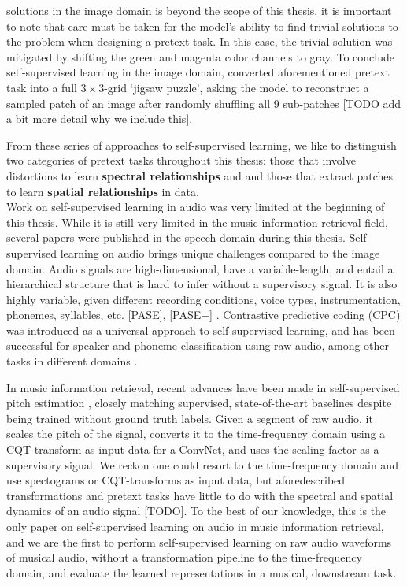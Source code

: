 solutions in the image domain is beyond the scope of this thesis, it is important to note that care must be taken for the model's ability to find trivial solutions to the problem when designing a pretext task. In this case, the trivial solution was mitigated by shifting the green and magenta color channels to gray. To conclude self-supervised learning in the image domain, \cite{noroozi_unsupervised_2016} converted aforementioned pretext task into a full $3\times 3$-grid `jigsaw puzzle', asking the model to reconstruct a sampled patch of an image after randomly shuffling all 9 sub-patches [TODO add a bit more detail why we include this].

From these series of approaches to self-supervised learning, we like to distinguish two categories of pretext tasks throughout this thesis: those that involve distortions to learn \textbf{spectral relationships} and and those that extract patches to learn \textbf{spatial relationships} in data. \\


Work on self-supervised learning in audio was very limited at the beginning of this thesis. While it is still very limited in the music information retrieval field, several papers were published in the speech domain during this thesis. Self-supervised learning on audio brings unique challenges compared to the image domain. Audio signals are high-dimensional, have a variable-length, and entail a hierarchical structure that is hard to infer without a supervisory signal. It is also highly variable, given different recording conditions, voice types, instrumentation, phonemes, syllables, etc. [PASE]\cite{Pascual2019}, [PASE+] \cite{Ravanelli2020}. Contrastive predictive coding (CPC) was introduced as a universal approach to self-supervised learning, and has been successful for speaker and phoneme classification using raw audio, among other tasks in different domains \cite{oord_representation_2019}.

In music information retrieval, recent advances have been made in self-supervised pitch estimation \cite{spice}, closely matching supervised, state-of-the-art baselines despite being trained without ground truth labels. Given a segment of raw audio, it scales the pitch of the signal, converts it to the time-frequency domain using a CQT transform as input data for a ConvNet, and uses the scaling factor as a supervisory signal. We reckon one could resort to the time-frequency domain and use spectograms or CQT-transforms as input data, but aforedescribed transformations and pretext tasks have little to do with the spectral and spatial dynamics of an audio signal [TODO]. To the best of our knowledge, this is the only paper on self-supervised learning on audio in music information retrieval, and we are the first to perform self-supervised learning on raw audio waveforms of musical audio, without a transformation pipeline to the time-frequency domain, and evaluate the learned representations in a musical, downstream task.


